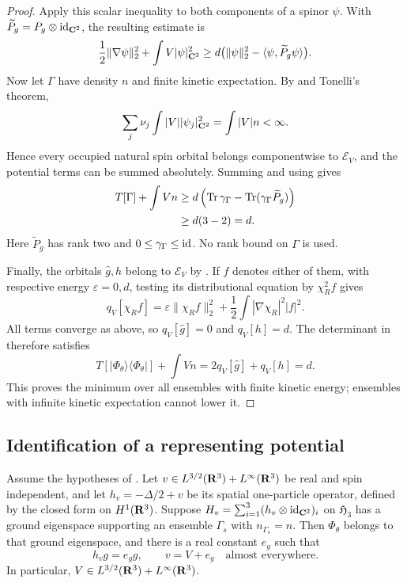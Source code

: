 \begin{proof}
Apply this scalar inequality to both components of a spinor $\psi$.
With $\widetilde P_g=P_g\otimes\operatorname{id}_{\mathbf C^2}$, the resulting estimate is
\begin{equation}
 \frac12\|\nabla\psi\|_2^2+\int V|\psi|_{\mathbf C^2}^2
 \ge d\bigl(\|\psi\|_2^2
             -\langle\psi,\widetilde P_g\psi\rangle\bigr).
 \label{eq:ensemble-spinor-bound}
\end{equation}
Now let $\Gamma$ have density $n$ and finite kinetic expectation.
By  and Tonelli's
theorem,
\[
 \sum_j\nu_j\int|V||\psi_j|_{\mathbf C^2}^2=\int|V|n<\infty.
\]
Hence every occupied natural spin orbital belongs componentwise to
$\mathcal E_V$, and the potential terms can be summed absolutely.
Summing  and using
 gives
\begin{align*}
 T[\Gamma]+\int Vn
 &\ge d\left(\operatorname{Tr}\gamma_\Gamma
                -\operatorname{Tr}(\gamma_\Gamma\widetilde P_g)\right)\\
 &\ge d(3-2)=d.
\end{align*}
Here $\widetilde P_g$ has rank two and
$0\le\gamma_\Gamma\le\operatorname{id}$.  No rank bound on $\Gamma$ is used.

Finally, the orbitals $\widehat g,h$ belong to $\mathcal E_V$ by
.  If $f$ denotes either of them,
with respective energy $\varepsilon=0,d$, testing its distributional
equation by $\chi_R^2 f$ gives
\[
 q_V[\chi_R f]
 =\varepsilon\|\chi_R f\|_2^2
   +\frac12\int|\nabla\chi_R|^2|f|^2.
\]
All terms converge as above, so $q_V[\widehat g]=0$ and $q_V[h]=d$.
The determinant in  therefore satisfies
\[
 T[|\Phi_\theta\rangle\langle\Phi_\theta|]+\int Vn
 =2q_V[\widehat g]+q_V[h]=d.
\]
This proves the minimum over all ensembles with finite kinetic energy;
ensembles with infinite kinetic expectation cannot lower it.
\end{proof}

\subsection{Identification of a representing potential}

\begin{proposition}
\label{prop:potential-identification}
Assume the hypotheses of .  Let
$v\in L^{3/2}(\mathbf R^3)+L^\infty(\mathbf R^3)$ be real and spin independent,
and let $h_v=-\Delta/2+v$ be its spatial one-particle operator, defined
by the closed form on $H^1(\mathbf R^3)$.  Suppose
$H_v=\sum_{i=1}^3(h_v\otimes\operatorname{id}_{\mathbf C^2})_i$ on $\mathfrak H_3$
has a ground eigenspace supporting an ensemble $\Gamma_s$ with
$n_{\Gamma_s}=n$.  Then $\Phi_\theta$ belongs to that ground eigenspace,
and there is a real constant $e_g$ such that
\begin{equation}
 h_v g=e_g g,
 \qquad v=V+e_g\quad\text{almost everywhere}.
 \label{eq:ensemble-potential-identification}
\end{equation}
In particular, $V\in L^{3/2}(\mathbf R^3)+L^\infty(\mathbf R^3)$.
\end{proposition}

